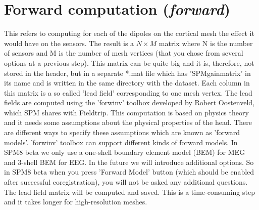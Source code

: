 \section{Forward computation (\textit{forward})}
This refers to computing for each of the dipoles on the cortical mesh the effect it would have on the sensors. The result
is a $N \times M$ matrix where N is the number of sensors and M is the number of mesh vertices (that you chose from several options
at a previous step). This matrix can be quite big and it is, therefore, not stored in the header, but in a separate *.mat file which has
'SPMgainmatrix' in its name and is written in the same directory with the dataset. Each column in this matrix is a so called 'lead field'
corresponding to one mesh vertex. The lead fields are computed using the 'forwinv' toolbox developed by Robert Oostenveld, which 
SPM shares with Fieldtrip. This computation is based on physics theory and it needs some assumptions about the physical properties of the head.
There are different ways to specify these assumptions which are known as 'forward models'. 'forwinv' toolbox can support different kinds of forward 
models. In SPM8 beta we only use a one-shell boundary element model (BEM) for MEG and 3-shell BEM for EEG. In the future we will introduce additional
options. So in SPM8 beta when you press 'Forward Model' button (which should be enabled after successful coregistration), you will not be asked
any additional questions. The lead field matrix will be computed and saved. This is a time-consuming step and it takes longer for high-resolution
meshes.


